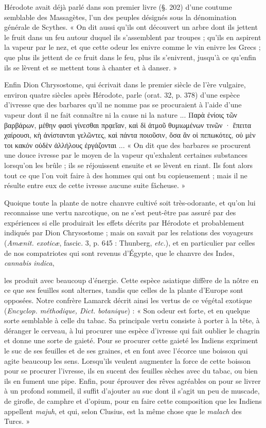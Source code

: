 \documentclass[a4paper, 11pt, oneside, polutonikogreek]{article}
\begin{document}
Hérodote avait déjà parlé dans son premier livre (§. 202) d'une coutume semblable des Massagètes, l'un des peuples désignés sous la dénomination générale de Scythes. « On dit aussi qu'ils ont découvert un arbre dont ils jettent le fruit dans un feu autour duquel ils s'assemblent par troupes ; qu'ils en aspirent la vapeur par le nez, et que cette odeur les enivre comme le vin enivre les Grecs ; que plus ils jettent de ce fruit dans le feu, plus ils s'enivrent, jusqu'à ce qu'enfin ils se lèvent et se mettent tous à chanter et à danser. »

Enfin Dion Chrysostome, qui écrivait dans le premier siècle de l'ère vulgaire, environ quatre siècles après Hérodote, parle (orat. 32, p. 378) d'une espèce d'ivresse que des barbares qu'il ne nomme pas se procuraient à l'aide d'une vapeur dont il ne fait connaître ni la cause ni la nature ... Παρὰ ἐνίοις τῶν βαρβάρων, μέθην φασὶ γίνεσθαι πρᾳεῖαν, καὶ δἰ ἀτμοῦ θυμιωμένων τινῶν · ἕπειτα χαίρουσι, κὴ ἀνίστανται γελῶντες, καὶ πάντα ποιοῦσιν, ὅσα ἂν οἱ πεπωκότες, οὐ μὲν τοι κακόν οὐδὲν ἀλλήλους ἐργάζονται ... « On dit que des barbares se procurent une douce ivresse par le moyen de la vapeur qu'exhalent certaines substances lorsqu'on les brûle ; ils se réjouissent ensuite et se lèvent en riant. Ils font alors tout ce que l'on voit faire à des hommes qui ont bu copieusement ; mais il ne résulte entre eux de cette ivresse aucune suite fâcheuse. »

Quoique toute la plante de notre chanvre cultivé soit très-odorante, et qu'on lui reconnaisse une vertu narcotique, on ne s'est peut-être pas assuré par des expériences si elle produirait les effets décrits par Hérodote et probablement indiqués par Dion Chrysostome ; mais on savait par les relations des voyageurs (\emph{Amænit. exoticæ}, fascic. 3, p. 645 : Thunberg, \emph{etc.}), et en particulier par celles de nos compatriotes qui sont revenus d'Égypte, que le chanvre des Indes, \emph{cannabis indica},

les produit avec beaucoup d'énergie. Cette espèce asiatique diffère de la nôtre en ce que ses feuilles sont alternes, tandis que celles de la plante d'Europe sont opposées. Notre confrère Lamarck décrit ainsi les vertus de ce végétal exotique (\emph{Encyclop. méthodique, Dict. botanique}) : « Son odeur est forte, et en quelque sorte semblable à celle du tabac. Sa principale vertu consiste à porter à la tête, à déranger le cerveau, à lui procurer une espèce d'ivresse qui fait oublier le chagrin et donne une sorte de gaieté. Pour se procurer cette gaieté les Indiens expriment le suc de ses feuilles et de ses graines, et en font avec l'écorce une boisson qui agite beaucoup les sens. Lorsqu'ils veulent augmenter la force de cette boisson pour se procurer l'ivresse, ils en sucent des feuilles sèches avec du tabac, ou bien ils en fument une pipe. Enfin, pour éprouver des rêves agréables on pour se livrer à un profond sommeil, il suffit d'ajouter au suc dont il s'agit un peu de muscade, de girofle, de camphre et d'opium, pour en faire cette composition que les Indiens appellent \emph{majuh}, et qui, selon Clusius, est la même chose que le \emph{malach} des Turcs. »
\end{document}
